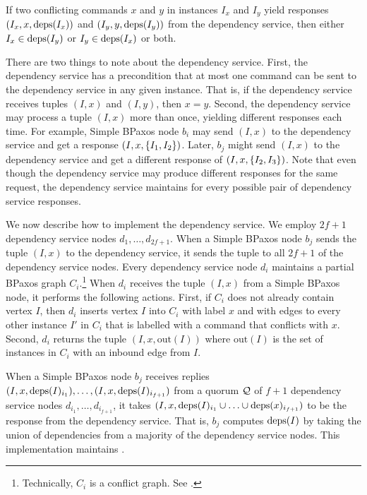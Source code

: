 \begin{invariant}
If two conflicting commands $x$ and $y$ in instances $I_x$ and $I_y$ yield
responses $(I_x, x, \text{deps}(I_x))$ and $(I_y, y, \text{deps}(I_y))$ from the dependency
service, then either $I_x \in \text{deps}(I_y)$ or $I_y \in \text{deps}(I_x)$ or both.
\end{invariant}

There are two things to note about the dependency service.
%
First, the dependency service has a precondition that at most one command can
be sent to the dependency service in any given instance. That is, if the
dependency service receives tuples $(I, x)$ and $(I, y)$, then $x = y$.
%
Second, the dependency service may process a tuple $(I, x)$ more than once,
yielding different responses each time. For example, Simple BPaxos node $b_i$
may send $(I, x)$ to the dependency service and get a response $(I, x,
\{I_1, I_2\})$. Later, $b_j$ might send $(I, x)$ to the dependency service
and get a different response of $(I, x, \{I_2, I_3\})$. Note that even though
the dependency service may produce different responses for the same request,
the dependency service maintains  for every possible
pair of dependency service responses.

\newcommand{\out}[1]{\text{out}(#1)}
We now describe how to implement the dependency service. We employ $2f + 1$
dependency service nodes $d_{1}, \ldots, d_{2f + 1}$. When a Simple BPaxos node
$b_j$ sends the tuple $(I, x)$ to the dependency service, it sends the tuple to
all $2f + 1$ of the dependency service nodes. Every dependency service node
$d_i$ maintains a partial BPaxos graph $C_i$.\footnote{Technically, $C_i$ is a
conflict graph. See .} When $d_i$ receives the
tuple $(I, x)$ from a Simple BPaxos node, it performs the following actions.
%
First, if $C_i$ does not already contain vertex $I$, then $d_i$ inserts vertex
$I$ into $C_i$ with label $x$ and with edges to every other instance $I'$ in
$C_i$ that is labelled with a command that conflicts with $x$.
%
Second, $d_i$ returns the tuple $(I, x, \out{I})$ where $\out{I}$ is the set of
instances in $C_i$ with an inbound edge from $I$.

When a Simple BPaxos node $b_j$ receives replies $(I, x, \text{deps}(I)_{i_1}),
\ldots, (I, x, \text{deps}(I)_{i_{f+1}})$ from a quorum $\mathcal{Q}$ of $f + 1$
dependency service nodes $d_{i_1}, \ldots, d_{i_{f+1}}$, it takes $(I, x,
\text{deps}(I)_{i_1} \cup \ldots \cup \text{deps}(x)_{i_{f+1}})$ to be the response from
the dependency service. That is, $b_j$ computes $\text{deps}(I)$ by taking the union
of dependencies from a majority of the dependency service nodes.
%
This implementation maintains .

